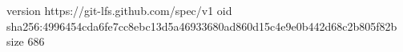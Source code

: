 version https://git-lfs.github.com/spec/v1
oid sha256:4996454cda6fe7cc8ebc13d5a46933680ad860d15c4e9e0b442d68c2b805f82b
size 686
